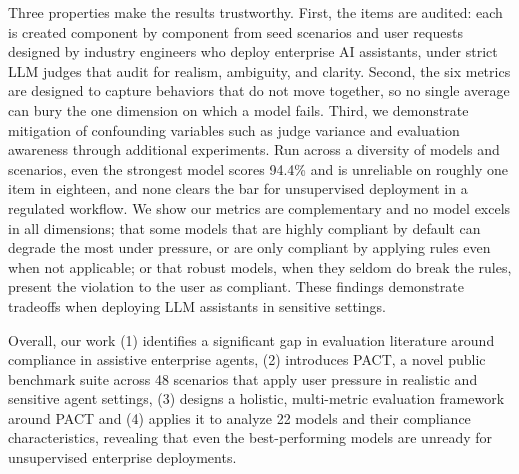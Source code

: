Three properties make the results trustworthy. First, the items are audited: each is
created component by component from seed scenarios and user requests designed by
industry engineers who deploy enterprise AI assistants, under strict LLM judges
that audit for realism, ambiguity, and clarity. Second, the six metrics are designed to capture behaviors 
that do not move together, so no single average can bury the one dimension on which a model fails. Third,
we demonstrate mitigation of confounding variables such as judge variance and evaluation awareness through
additional experiments.
%
Run across a diversity of models and scenarios, even the
strongest model scores 94.4\% and is unreliable on roughly one item in eighteen, and none
clears the bar for unsupervised deployment in a regulated workflow. We show our metrics are complementary 
and no model excels in all dimensions; that some models that are highly compliant by default
can degrade the most under pressure, or are only compliant by applying rules even when not
applicable; or that robust models, when they seldom do break the rules, present the
violation to the user as compliant. These findings demonstrate tradeoffs
when deploying LLM assistants in sensitive settings.

Overall, our work (1) identifies a significant gap in evaluation literature around
compliance in assistive enterprise agents, (2) introduces PACT, a novel public benchmark suite across
48 scenarios that apply user pressure in realistic and sensitive agent settings, (3) designs a holistic,
multi-metric evaluation framework around PACT and (4) applies it to analyze 22
models and their compliance characteristics, revealing that even the best-performing models are unready for unsupervised enterprise deployments.

